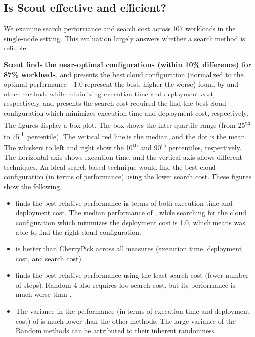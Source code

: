 \subsection{Is Scout effective and efficient?}

We examine search performance and search cost across 107 workloads in the single-node setting.
This evaluation largely answers whether a search method is reliable.

\textbf{Scout finds the near-optimal configurations
(within 10\% difference) for 87\% workloads}.
\myfigure{\ref{fig:single_time_overall_performance}} and \myfigure{\ref{fig:single_cost_overall_performance}} presents
the best cloud configuration (normalized to the optimal performance---1.0 represent the best, higher the worse) found by \scout and other methods while minimizing execution time and deployment cost, respectively. \myfigure{\ref{fig:single_time_overall_steps}} and \myfigure{\ref{fig:single_cost_overall_steps}} presents the search cost required the find the best cloud configuration which minimizes execution time and deployment cost, respectively. 
The figures display a box plot.
The box shows the inter-quartile range (from 25\textsuperscript{th} to 75\textsuperscript{th} percentile).
The vertical red line is the median, and the dot is the mean.
The whiskers to left and right show the 10\textsuperscript{th} and 90\textsuperscript{th} percentiles, respectively.
The horizontal axis shows execution time, and the vertical axis shows different techniques. 
An ideal search-based technique would find the best cloud configuration (in terms of performance) using the lower search cost.
These figures show the following.

\begin{itemize}[leftmargin=*]
    \item \scout finds the best relative performance in terms of both execution time and deployment cost. The median performance of \scout, while searching for the cloud configuration which minimizes the deployment cost is 1.0, which means \scout was able to find the right cloud configuration.
    \item \scout is better than CherryPick across all measures (execution time, deployment cost, and search cost).
    \item \scout finds the best relative performance using the least search cost (fewer number of steps). Random-4 also requires low search cost, but its performance is much worse than \scout.
    \item The variance in the performance (in terms of execution time and deployment cost) of \scout is much lower than the other methods. The large variance of the Random methods can be attributed to their inherent randomness.
\end{itemize}


